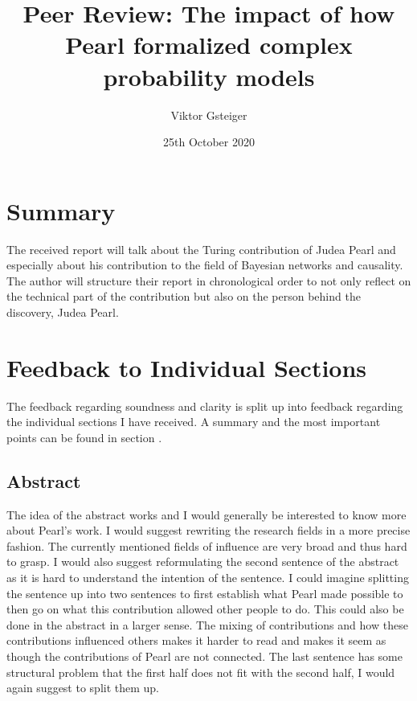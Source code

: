 \documentclass{article}
\title{Peer Review: The impact of how Pearl formalized complex probability models}
\date{25th October 2020}
\author{Viktor Gsteiger}
\begin{document}
\maketitle

\section{Summary}
The received report will talk about the Turing contribution of Judea Pearl and especially about his contribution to the field of Bayesian networks and causality. The author will structure their report in chronological order to not only reflect on the technical part of the contribution but also on the person behind the discovery, Judea Pearl.

\section{Feedback to Individual Sections}
The feedback regarding soundness and clarity is split up into feedback regarding the individual sections I have received. A summary and the most important points can be found in section .

\subsection{Abstract}
The idea of the abstract works and I would generally be interested to know more about Pearl's work. I would suggest rewriting the research fields in a more precise fashion. The currently mentioned fields of influence are very broad and thus hard to grasp. I would also suggest reformulating the second sentence of the abstract as it is hard to understand the intention of the sentence. I could imagine splitting the sentence up into two sentences to first establish what Pearl made possible to then go on what this contribution allowed other people to do. This could also be done in the abstract in a larger sense. The mixing of contributions and how these contributions influenced others makes it harder to read and makes it seem as though the contributions of Pearl are not connected. The last sentence has some structural problem that the first half does not fit with the second half, I would again suggest to split them up.
\end{document}
